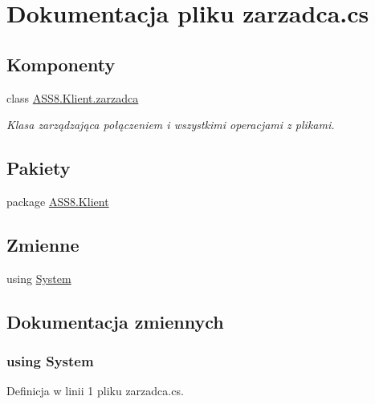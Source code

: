 \hypertarget{a00056}{
\section{Dokumentacja pliku zarzadca.cs}
\label{d9/d2e/a00056}
}
\subsection*{Komponenty}
\begin{CompactItemize}
\item 
class \hyperlink{a00037}{ASS8.Klient.zarzadca}
\begin{CompactList}\small\item\em Klasa zarządzająca połączeniem i wszystkimi operacjami z plikami. \item\end{CompactList}\end{CompactItemize}
\subsection*{Pakiety}
\begin{CompactItemize}
\item 
package \hyperlink{a00060}{ASS8.Klient}
\end{CompactItemize}
\subsection*{Zmienne}
\begin{CompactItemize}
\item 
﻿using \hyperlink{a00056_81a223a02c34d82b47199f08308847f2}{System}
\end{CompactItemize}


\subsection{Dokumentacja zmiennych}
\hypertarget{a00056_81a223a02c34d82b47199f08308847f2}{
\subsubsection[{System}]{\setlength{\rightskip}{0pt plus 5cm}﻿using {\bf System}}}
\label{d9/d2e/a00056_81a223a02c34d82b47199f08308847f2}




Definicja w linii 1 pliku zarzadca.cs.